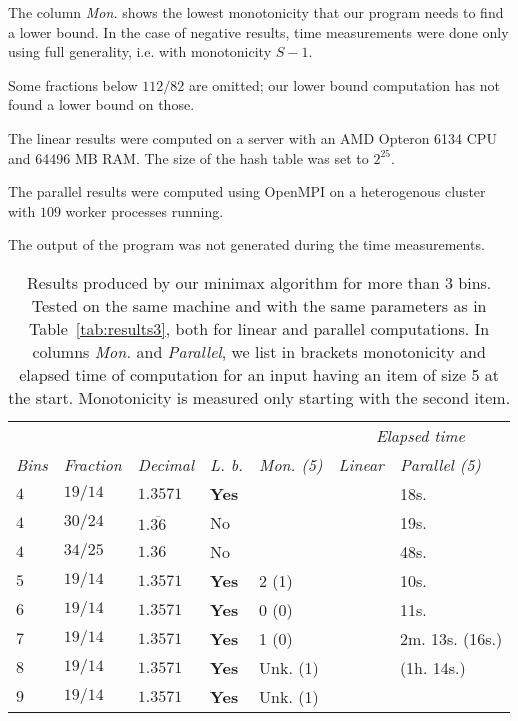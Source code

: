 \begin{table}[H]
{The column \textit{Mon.} shows the lowest monotonicity that our
program needs to find a lower bound. In the case of negative results,
time measurements were done only using full generality, i.e. with
monotonicity $S-1$.

Some fractions below $112/82$ are omitted; our lower bound computation
has not found a lower bound on those.

The linear results were computed on a server with an AMD Opteron 6134
CPU and 64496 MB RAM. The size of the hash table was set to $2^{25}$.

The parallel results were computed using OpenMPI on a heterogenous
cluster with $109$ worker processes running.

The output of the program was not generated during the
time measurements.}
\label{tab:results3}
\end{table}

\begin{table}[H]
\begin{center}
\begin{tabular}{lllllll}
& & & & & \multicolumn{2}{c}{\textit{Elapsed time}}  \\
\textit{Bins} & \textit{Fraction} & \textit{Decimal} & \textit{L. b.} & \textit{Mon. (5)} & \textit{Linear} & \textit{Parallel (5)}\\
\hline
$4$  & $19/14$ &  $1.3571$ & \textbf{Yes} & & & 18s.  \\
$4$  & $30/24$ & $1.\overline{36}$ & No   & & & 19s. \\
$4$  & $34/25$ &  $1.36$   & No           & & & 48s.  \\ 
$5$  & $19/14$ &  $1.3571$ & \textbf{Yes} & 2 (1) & & 10s. \\
$6$  & $19/14$ &  $1.3571$ & \textbf{Yes} & 0 (0) & & 11s. \\
$7$  & $19/14$ &  $1.3571$ & \textbf{Yes} & 1 (0) & & 2m. 13s. (16s.) \\
$8$  & $19/14$ &  $1.3571$ & \textbf{Yes} & Unk. (1) & & (1h. 14s.)  \\
$9$  & $19/14$ &  $1.3571$ & \textbf{Yes} & Unk. (1) & &  \\
\end{tabular}
\end{center}
\caption{Results produced by our minimax algorithm for more than $3$ bins.
Tested on the same machine and with the same parameters
as in Table~\ref{tab:results3}, both for linear and parallel
computations. In columns \textit{Mon.} and \textit{Parallel}, we list
in brackets monotonicity and elapsed time of computation for an input
having an item of size 5 at the start. Monotonicity is measured only
starting with the second item.}
\label{tab:resultsmulti}
\end{table}


